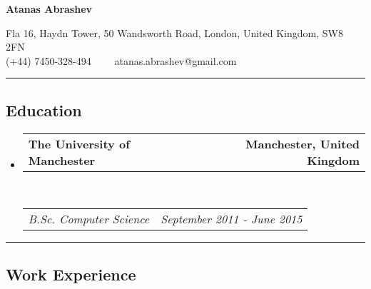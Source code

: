 \documentclass[10pt,letterpaper]{article}
\makeatletter
\newcommand{\headerrow}[2]
{\begin{tabular*}{\linewidth}{l@{\extracolsep{\fill}}r}
    #1 &
    #2 \\
\end{tabular*}}
\makeatother
\begin{document}
\begin{center}
{\LARGE \textbf{Atanas Abrashev}}

Fla 16, Haydn Tower,
50 Wandsworth Road,
London, United Kingdom,
SW8 2FN
\\
(+44) 7450-328-494\ \ \textbullet
\ \ atanas.abrashev@gmail.com
\end{center}

\hrule
\vspace{-0.4em}
\subsection*{Education}

\begin{itemize}
    \parskip=0.1em

    \item
    \headerrow
        {\textbf{The University of Manchester}}
        {\textbf{Manchester, United Kingdom}}
    \\
    \headerrow
        {\emph{B.Sc. Computer Science}}
        {\emph{September 2011 - June 2015}}
\end{itemize}

\hrule
\vspace{-0.4em}
\subsection*{Work Experience}
\end{document}
